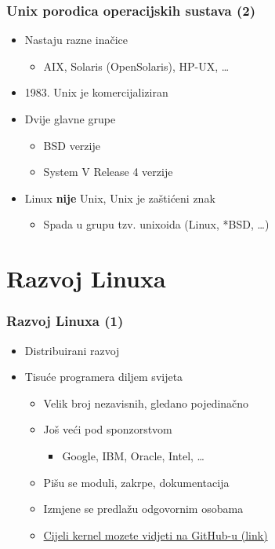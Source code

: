 \documentclass{beamer}
\begin{document}
\begin{frame}[t]
\frametitle{Unix porodica operacijskih sustava (2)}
\begin{itemize}
  \item Nastaju razne inačice
  \begin{itemize}
    \item AIX, Solaris (OpenSolaris), HP-UX, \ldots
  \end{itemize}
  \item 1983. Unix je komercijaliziran
  \item Dvije glavne grupe
  \begin{itemize}
    \item BSD verzije
    \item System V Release 4 verzije
  \end{itemize}
  \item Linux \textbf{nije} Unix, Unix je zaštićeni znak
  \begin{itemize}
    \item Spada u grupu tzv. unixoida (Linux, *BSD, \ldots)
  \end{itemize}
\end{itemize}
\end{frame}

\section{Razvoj Linuxa}
\begin{frame}[t]
\frametitle{Razvoj Linuxa (1)}
\begin{itemize}
  \item Distribuirani razvoj 
  \item Tisuće programera diljem svijeta
  \begin{itemize}
    \item Velik broj nezavisnih, gledano pojedinačno
    \item Još veći pod sponzorstvom
    \begin{itemize}
      \item Google, IBM, Oracle, Intel, \ldots
    \end{itemize}
  \item Pišu se moduli, zakrpe, dokumentacija
  \item Izmjene se predlažu odgovornim osobama
  \item \href{https://github.com/torvalds/linux}{Cijeli kernel mozete vidjeti na GitHub-u (link)}
  \end{itemize}
\end{itemize}
\end{frame}
\end{document}

